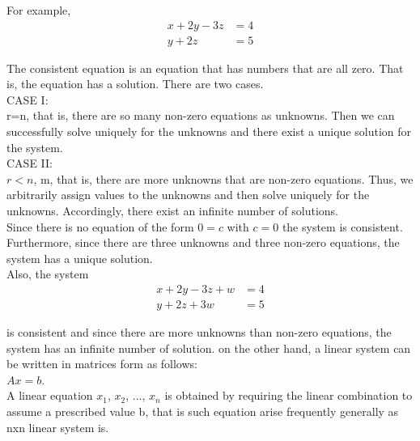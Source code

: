 \documentclass[a4paper, 12pt]{report}
\begin{document}
{ For example,\\
     
 \begin{align}
 x + 2y -3z&=4\\
 y + 2z&=5
 \end{align}
         
 The consistent equation is an equation that has numbers that are all zero. That is, the equation has a solution. There are two cases.\\
         
         CASE I:\\
         
         r=n, that is, there are so many non-zero equations as unknowns. Then we can successfully solve uniquely for the unknowns and there exist a unique solution for the system.\\
         
         CASE II:\\
         
         $r < n$, m, that is, there are more unknowns that are non-zero equations. Thus, we arbitrarily assign values to the unknowns and then solve uniquely for the unknowns. Accordingly, there exist an infinite number of solutions.\\
         
         Since there is no equation of the form $0 = c$ with $c = 0$ the system is consistent. Furthermore, since there are three unknowns and three non-zero equations, the system has a unique solution.\\ 
         
         Also, the system
         \begin{align}
         x + 2y- 3z+ w&=4\\
         y + 2z + 3w&=5
          \end{align}
          
          
          
          is consistent and since there are more unknowns than non-zero equations, the system has an infinite number of solution. on the other hand, a linear system can be written in matrices form as follows:\\
          
          $Ax=b$.\\
          
          A linear equation $x_1$, $x_2$, ..., $x_n$ is obtained by requiring the linear combination to assume a prescribed value b, that is such equation arise frequently generally as nxn linear system is.\\
          
}
\end{document}
